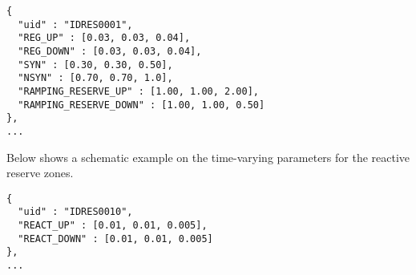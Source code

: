 \begin{verbatim}
{
  "uid" : "IDRES0001",
  "REG_UP" : [0.03, 0.03, 0.04],
  "REG_DOWN" : [0.03, 0.03, 0.04],
  "SYN" : [0.30, 0.30, 0.50],
  "NSYN" : [0.70, 0.70, 1.0],  
  "RAMPING_RESERVE_UP" : [1.00, 1.00, 2.00],  
  "RAMPING_RESERVE_DOWN" : [1.00, 1.00, 0.50]
},
...
\end{verbatim}


Below shows a schematic example on the time-varying parameters for the reactive reserve zones. 
\begin{verbatim}
{
  "uid" : "IDRES0010",
  "REACT_UP" : [0.01, 0.01, 0.005],
  "REACT_DOWN" : [0.01, 0.01, 0.005]
},
...
\end{verbatim}




